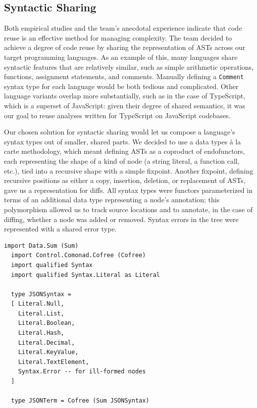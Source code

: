 \documentclass[acmsmall,fleqn,12pt]{acmart}
\begin{document}
\subsection{Syntactic Sharing} \label{sec:sharing}

Both empirical studies \cite{Haefliger08Code} and the team’s anecdotal
experience indicate that code reuse is an effective method for managing
complexity. The team decided to achieve a degree of code reuse by sharing the
representation of ASTs across our target programming languages. As an example of
this, many languages share syntactic features that are relatively similar, such
as simple arithmetic operations, functions, assignment statements, and comments.
Manually defining a \texttt{Comment} syntax type for each language would be both
tedious and complicated. Other language variants overlap more substantially,
such as in the case of TypeScript, which is a superset of JavaScript: given
their degree of shared semantics, it was our goal to reuse analyses written for
TypeScript on JavaScript codebases.

Our chosen solution for syntactic sharing would let us compose a language’s
syntax types out of smaller, shared parts. We decided to use a data types à la
carte \cite{Swierstra08Data} methodology, which meant defining ASTs as a
coproduct of endofunctors, each representing the shape of a kind of node (a
string literal, a function call, etc.), tied into a recursive shape with a
simple fixpoint. Another fixpoint, defining recursive positions as either a
copy, insertion, deletion, or replacement of ASTs, gave us a representation for
diffs. All syntax types were functors parameterized in terms of an additional
data type representing a node's annotation; this polymorphism allowed us to
track source locations and to annotate, in the case of diffing, whether a node
was added or removed. Syntax errors in the tree were represented with a shared
error type.

\begin{lstlisting}[label={code:dtalc}, keywords={type}, title=A representation of JSON syntax written with data types à la carte.]
  import Data.Sum (Sum)
  import Control.Comonad.Cofree (Cofree)
  import qualified Syntax
  import qualified Syntax.Literal as Literal

  type JSONSyntax =
  [ Literal.Null,
    Literal.List,
    Literal.Boolean,
    Literal.Hash,
    Literal.Decimal,
    Literal.KeyValue,
    Literal.TextElement,
    Syntax.Error -- for ill-formed nodes
  ]

  type JSONTerm = Cofree (Sum JSONSyntax)
\end{lstlisting}
\end{document}

